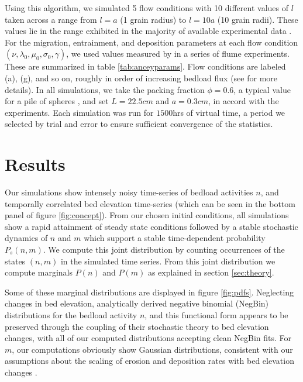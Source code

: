 \documentclass[draft]{agujournal2018}
\begin{document}
Using this algorithm, we simulated 5 flow conditions with 10 different values of $l$ taken across a range from $l=a$ (1 grain radius) to $l=10a$ (10 grain radii).
These values lie in the range exhibited in the majority of available experimental data \citep{Wong2007,Singh2009,Martin2014}.
For the migration, entrainment, and deposition parameters at each flow condition $(\nu, \lambda_0, \mu_0, \sigma_0, \gamma)$, we used values measured by \citet{Ancey2008} in a series of flume experiments.
These are summarized in table \ref{tab:anceyparams}.
Flow conditions are labeled (a), (g), and so on, roughly in order of increasing bedload flux (see \citet{Ancey2008} for more details). 
In all simulations, we take the packing fraction $\phi = 0.6$, a typical value for a pile of spheres \citep[e.g.][]{Bennett1972}, and set $L = 22.5cm$ and $a = 0.3 cm$, in accord with the \citet{Ancey2008} experiments.
Each simulation was run for $1500$hrs of virtual time, a period we selected by trial and error to ensure sufficient convergence of the statistics.

\section{Results}

Our simulations show intensely noisy time-series of bedload activities $n$, and temporally correlated bed elevation time-series (which can be seen in the bottom panel of figure \ref{fig:concept}).
From our chosen initial conditions, all simulations show a rapid attainment of steady state conditions followed by a stable stochastic dynamics of $n$ and $m$ which support a stable time-dependent probability $P_s(n,m)$. We compute this joint distribution by counting occurrences of the states $(n,m)$ in the simulated time series.
From this joint distribution we compute marginals $P(n)$ and $P(m)$ as explained in section \ref{sec:theory}.

Some of these marginal distributions are displayed in figure \ref{fig:pdfs}.
Neglecting changes in bed elevation, \citet{Ancey2008} analytically derived negative binomial (NegBin) distributions for the bedload activity $n$, and this functional form appears to be preserved through the coupling of their stochastic theory to bed elevation changes, with all of our computed distributions accepting clean NegBin fits.
For $m$, our computations obviously show Gaussian distributions, consistent with our assumptions about the scaling of erosion and deposition rates with bed elevation changes \citep[e.g.][]{Wong2007}.
\end{document}
